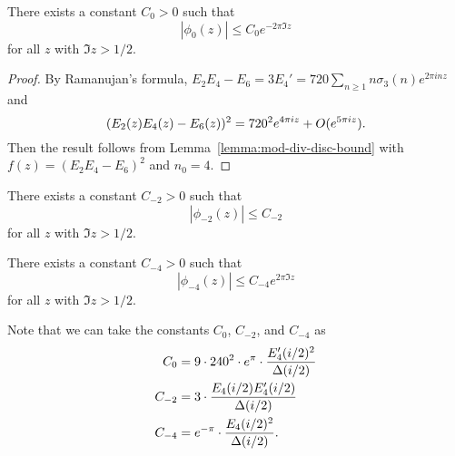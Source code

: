 \begin{corollary}\label{cor:phi0-bound}
There exists a constant $C_0 > 0$ such that
\begin{equation}\label{eqn:phi0-bound}
|\phi_0(z)| \le C_0 e^{-2 \pi \Im z}
\end{equation}
for all $z$ with $\Im z > 1/2$.
\end{corollary}
\begin{proof}
By Ramanujan's formula, $E_2 E_4 - E_6 = 3E_4' = 720 \sum_{n \ge 1} n \sigma_3(n) e^{2 \pi i n z}$ and
\begin{equation}
    (E_2(z) E_4(z) - E_6(z))^{2} = 720^{2} e^{4 \pi i z} + O(e^{5 \pi i z}). \notag
\end{equation}
Then the result follows from Lemma~\ref{lemma:mod-div-disc-bound} with $f(z) = (E_2 E_4 - E_6)^2$ and $n_0 = 4$.
\end{proof}

\begin{corollary}\label{cor:phi2-bound}
There exists a constant $C_{-2} > 0$ such that
\begin{equation}\label{eqn:phi2-bound}
    |\phi_{-2}(z)| \le C_{-2}
\end{equation}
for all $z$ with $\Im z > 1/2$.
\end{corollary}

\begin{corollary}\label{cor:phi4-bound}
There exists a constant $C_{-4} > 0$ such that
\begin{equation}\label{eqn:phi4-bound}
    |\phi_{-4}(z)| \le C_{-4} e^{2 \pi \Im z}
\end{equation}
for all $z$ with $\Im z > 1/2$.
\end{corollary}

Note that we can take the constants $C_0$, $C_{-2}$, and $C_{-4}$ as
\begin{align}
    C_0 &= 9 \cdot 240^2 \cdot e^{\pi} \cdot \frac{E_4'(i/2)^{2}}{\Delta(i/2)} \notag \\
    C_{-2} &= 3 \cdot \frac{E_4(i/2) E_4'(i/2)}{\Delta(i/2)} \notag \\
    C_{-4} &= e^{-\pi} \cdot \frac{E_4(i/2)^{2}}{\Delta(i/2)}. \notag
\end{align}

